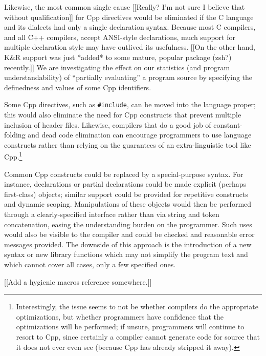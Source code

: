 \documentclass[10pt]{article}
\begin{document}
Likewise, the most common single cause [[Really?  I'm not sure I believe
that without qualification]] for Cpp directives would be eliminated if the
C language and its dialects had only a single declaration syntax.  Because
most C compilers, and all C++ compilers, accept ANSI-style declarations,
much support for multiple declaration style may have outlived its
usefulness.  [[On the other hand, K\&R support was just *added* to some
mature, popular package (zsh?) recently.]]  We are investigating the effect
on our statistics (and program understandability) of ``partially
evaluating'' a program source by specifying the definedness and values of
some Cpp identifiers.

Some Cpp directives, such as {\tt \#include}, can be moved into the
language proper; this would also eliminate the need for Cpp constructs that
prevent multiple inclusion of header files.  Likewise, compilers that do a
good job of constant-folding and dead code elimination can encourage
programmers to use language constructs rather than relying on the
guarantees of an extra-linguistic tool like Cpp.\footnote{Interestingly,
  the issue seems to not be whether compilers do the appropriate
  optimizations, but whether programmers have confidence that the
  optimizations will be performed; if unsure, programmers will continue to
  resort to Cpp, since certainly a compiler cannot generate code for source
  that it does not ever even see (because Cpp has already stripped it
  away).}

Common Cpp constructs could be replaced by a special-purpose syntax.  For
instance, declarations or partial declarations could be made explicit
(perhaps first-class) objects; similar support could be provided for
repetitive constructs and dynamic scoping.  Manipulations of these objects
would then be performed through a clearly-specified interface rather than
via string and token concatenation, easing the understanding burden on the
programmer.  Such uses would also be visible to the compiler and could be
checked and reasonable error messages provided.  The downside of this
approach is the introduction of a new syntax or new library functions which
may not simplify the program text and which cannot cover all cases, only a
few specified ones.

[[Add a hygienic macros reference somewhere.]]
\end{document}
